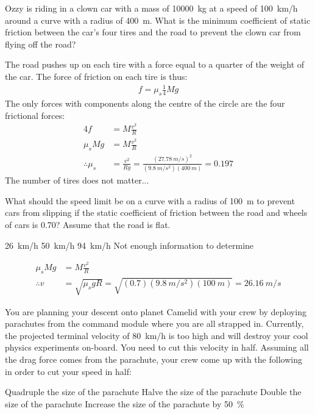 \question Ozzy is riding in a clown car with a mass of \SI{10000}{kg} at a speed of \SI{100}{km/h} around a curve with a radius of \SI{400}{m}. What is the minimum coefficient of static friction between the car's four tires and the road to prevent the clown car from flying off the road?
\begin{checkboxes}
 \correct
{}
\end{checkboxes}
\begin{solution}
The road pushes up on each tire with a force equal to a quarter of the weight of the car. The force of friction on each tire is thus:
\begin{align*}
f=\mu_s\frac{1}{4}Mg
\end{align*}
The only forces with components along the centre of the circle are the four frictional forces:
\begin{align*}
4f&=M\frac{v^2}{R}\\
\mu_sMg&=M\frac{v^2}{R}\\
\therefore \mu_s&=\frac{v^2}{Rg}=\frac{(\SI{27.78}{m/s})^2}{(\SI{9.8}{m/s^2})(\SI{400}{m})}=0.197
\end{align*}
The number of tires does not matter...
\end{solution}

\question What should the speed limit be on a curve with a radius of \SI{100}{m} to prevent cars from slipping if the static coefficient of friction between the road and wheels of cars is 0.70? Assume that the road is flat.
\begin{checkboxes}
\choice \SI{26}{km/h}
\choice \SI{50}{km/h}
\CorrectChoice \SI{94}{km/h} \correct
\choice Not enough information to determine
\end{checkboxes}
\begin{solution}
\begin{align*}
\mu_sMg&=M\frac{v^2}{R}\\
\therefore v&=\sqrt{\mu_sgR}=\sqrt{(0.7)(\SI{9.8}{m/s^2})(\SI{100}{m})}=\SI{26.16}{m/s}
\end{align*}
\end{solution}


\question You are planning your descent onto planet Camelid with your crew by deploying parachutes from the command module where you are all strapped in. Currently, the projected terminal velocity of \SI{80}{km/h} is too high and will destroy your cool physics experiments on-board. You need to cut this velocity in half. 
Assuming all the drag force comes from the parachute, your crew come up with the following in order to cut your speed in half:
\begin{checkboxes}
\CorrectChoice Quadruple the size of the parachute \correct
\choice Halve the size of the parachute
\choice Double the size of the parachute
\choice Increase the size of the parachute by \SI{50}{\%}
\end{checkboxes}



